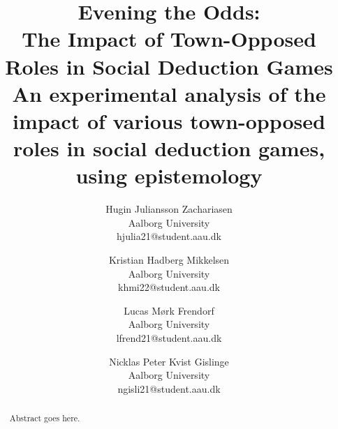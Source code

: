 \documentclass[twocolumn]{article}
\begin{document}
\title{Evening the Odds:\\ The Impact of Town-Opposed Roles in Social Deduction 
Games\\ \small An experimental analysis of the impact of various 
town-opposed roles in social deduction games, using epistemology}
\author{
	Hugin Juliansson Zachariasen \\ Aalborg University \\ hjulia21@student.aau.dk
	\and
	Kristian Hadberg Mikkelsen \\ Aalborg University \\ khmi22@student.aau.dk
	\and
	Lucas Mørk Frendorf \\ Aalborg University \\ lfrend21@student.aau.dk
	\and
	Nicklas Peter Kvist Gislinge \\ Aalborg University \\ ngisli21@student.aau.dk
}
\maketitle
\begin{abstract}
	Abstract goes here.
\end{abstract}










\clearpage
\appendix
\makeatletter
\def\@seccntformat#1{\appendixname\ \csname the#1\endcsname: }
\makeatother




\clearpage
\printbibliography[heading=bibintoc, title=Bibliography]
\label{bib:mybiblio}
\end{document}
